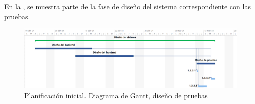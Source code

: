 En la , se muestra parte de la fase de diseño del sistema correspondiente con las pruebas.
\begin{figure}[H]
    \hypertarget{fig:5_PI-Gantt-Diseno-3}{}
    \centering
    \includegraphics[width=1\linewidth]{figures/5-Gantt/5-Gantt-Diseno-pruebas.png}
    \caption{Planificación inicial. Diagrama de Gantt, diseño de pruebas}
    \label{fig:5_PI-Gantt-Diseno-3}
\end{figure}


